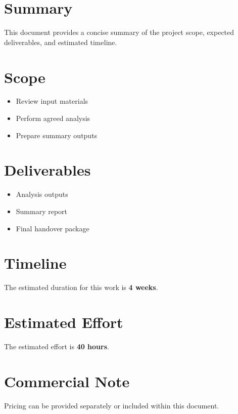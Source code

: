 \documentclass[11pt,a4paper]{article}
\newcommand{\EstimatedHours}{40 hours}
\newcommand{\ProjectDuration}{4 weeks}
\begin{document}
\CambiumTitlePage

\section{Summary}
This document provides a concise summary of the project scope, expected deliverables, and estimated timeline.

\section{Scope}
\begin{itemize}[leftmargin=1.5em]
    \item Review input materials
    \item Perform agreed analysis
    \item Prepare summary outputs
\end{itemize}

\section{Deliverables}
\begin{itemize}[leftmargin=1.5em]
    \item Analysis outputs
    \item Summary report
    \item Final handover package
\end{itemize}

\section{Timeline}
The estimated duration for this work is \textbf{\ProjectDuration}.

\section{Estimated Effort}
The estimated effort is \textbf{\EstimatedHours}.

\section{Commercial Note}
Pricing can be provided separately or included within this document.
\end{document}
